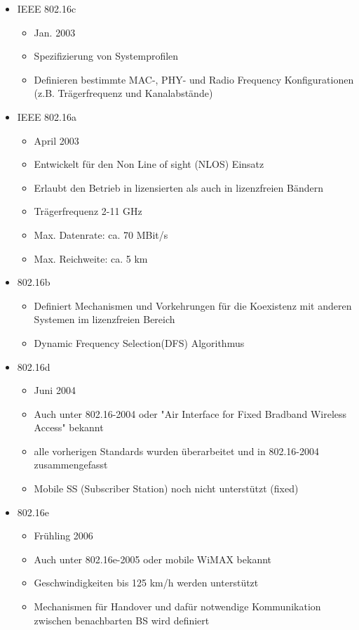 \begin{itemize}
\item IEEE 802.16c
\begin{itemize}
\item Jan. 2003
\item Spezifizierung von Systemprofilen
\item Definieren bestimmte MAC-, PHY- und Radio Frequency Konfigurationen (z.B. Trägerfrequenz und Kanalabstände)
\end{itemize}
\item IEEE 802.16a
\begin{itemize}
\item April 2003
\item Entwickelt für den Non Line of sight (NLOS) Einsatz
\item Erlaubt den Betrieb in lizensierten als auch in lizenzfreien Bändern
\item Trägerfrequenz 2-11 GHz
\item Max. Datenrate: ca. 70 MBit/s
\item Max. Reichweite: ca. 5 km
\end{itemize}
\item 802.16b
\begin{itemize}
\item Definiert Mechanismen und Vorkehrungen für die Koexistenz mit anderen Systemen im lizenzfreien Bereich
\item Dynamic Frequency Selection(DFS) Algorithmus
\end{itemize}
\item 802.16d
\begin{itemize}
\item Juni 2004
\item Auch unter 802.16-2004 oder "Air Interface for Fixed Bradband Wireless Access" bekannt
\item alle vorherigen Standards wurden überarbeitet und in 802.16-2004 zusammengefasst
\item Mobile SS (Subscriber Station) noch nicht unterstützt (fixed)
\end{itemize}
\item 802.16e
\begin{itemize}
\item Frühling 2006
\item Auch unter 802.16e-2005 oder mobile WiMAX bekannt
\item Geschwindigkeiten bis 125 km/h werden unterstützt
\item Mechanismen für Handover und dafür notwendige Kommunikation zwischen benachbarten BS wird definiert

\end{itemize}
\end{itemize}
